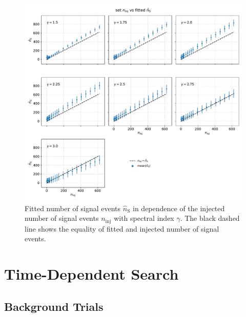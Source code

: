 \begin{figure}
    \centering
    \includegraphics[width=\linewidth]{Plots/05_csky/ns_fit_auto_4.pdf}
    \caption{Fitted number of signal events $\hat{n}_{\text{S}}$ in dependence of the injected number of signal events $n_\text{inj}$ with spectral index $\gamma$. The black dashed line shows the equality of fitted and injected number of signal events.}
    \label{fig:fit_bias_ns}
\end{figure}

\chapter{Time-Dependent Search}

\section{Background Trials}

